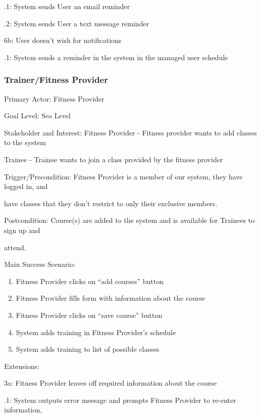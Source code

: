 \documentclass[12pt]{article}
\begin{document}
	.1: System sends User an email reminder
	
	.2: System sends User a text message reminder

\noindent 6b: User doesn’t wish for notifications
	
	.1: System sends a reminder in the system in the managed user schedule

\subsubsection{Trainer/Fitness Provider}
\noindent Primary Actor: Fitness Provider

\noindent Goal Level: Sea Level
\newline

\noindent Stakeholder and Interest: Fitness Provider - Fitness provider wants to add classes to the system

\noindent Trainee - Trainee wants to join a class provided by the fitness provider
\newline

\noindent Trigger/Precondition: Fitness Provider is a member of our system, they have logged in, and 

have classes that they don’t restrict to only their exclusive members. 

\noindent Postcondition: Course(s) are added to the system and is available for Trainees to sign up and 

attend. 
\newline

\noindent Main Success Scenario:
\begin{enumerate}
\item Fitness Provider clicks on “add courses” button 
\item Fitness Provider fills form with information about the course
\item Fitness Provider clicks on “save course” button
\item System adds training in Fitness Provider’s schedule 
\item System adds training to list of possible classes
\newline
\end{enumerate}

\noindent Extensions:

\noindent 3a: Fitness Provider leaves off required information about the course

	.1: System outputs error message and prompts Fitness Provider to re-enter information,
	
\end{document}

